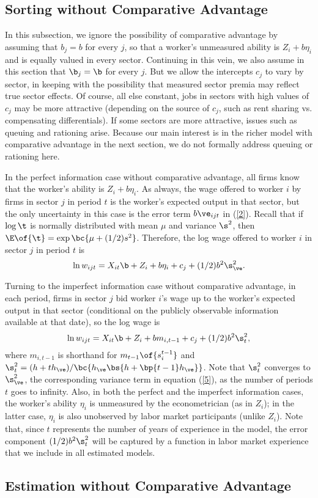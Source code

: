 \documentclass[12pt]{article}
\newcommand{\CiteReference}{../reference.bib}
\theoremstyle{definition}
\begin{document}
\subsection{Sorting without Comparative Advantage}

In this subsection, we ignore the possibility of comparative advantage by assuming that $b_j = b$ for every $j$, so that a worker's unmeasured ability is $Z_i + b \eta_i$ and is equally valued in every sector. Continuing in this vein, we also assume in this section that $\b_j = \b$ for every $j$. But we allow the intercepts $c_j$ to vary by sector, in keeping with the possibility that measured sector premia may reflect true sector effects. Of course, all else constant, jobs in sectors with high values of $c_j$ may be more attractive (depending on the source of $c_j$, such as rent sharing vs. compensating differentials). If some sectors are more attractive, issues such as queuing and rationing arise. Because our main interest is in the richer model with comparative advantage in the next section, we do not formally address queuing or rationing here. 

In the perfect information case without comparative advantage, all firms know that the worker's ability is $Z_i + b \eta_i$. As always, the wage offered to worker $i$ by firms in sector $j$ in period $t$ is the worker's expected output in that sector, but the only uncertainty in this case is the error term $b \ve_{ijt}$ in (\ref{2}). Recall that if $\log \t$ is normally distributed with mean $\mu$ and variance $\s^2$, then $\E\of{\t} = \exp\bc{\mu + (1/2)s^2}$. Therefore, the log wage offered to worker $i$ in sector $j$ in period $t$ is 
\begin{equation}
    \label{3}
    \ln w_{ijt} = X_{it} \b + Z_i + b \eta_i + c_j + (1/2) b^2 \s_\ve^2.
\end{equation}

Turning to the imperfect information case without comparative advantage, in each period, firms in sector $j$ bid worker $i$'s wage up to the worker's expected output in that sector (conditional on the publicly observable information available at that date), so the log wage is 
\begin{equation}
    \label{6}
    \ln w_{ijt} = X_{it} \b + Z_i + b m_{i, t-1} + c_j + (1/2) b^2 \s_t^2 ,
\end{equation}
where $m_{i, t-1}$ is shorthand for $m_{t-1}\of{s_i^{t-1}}$ and $\s_t^2 = (h + t h_\ve)/\bc{h_\ve\bs{h + \bp{t-1}h_\ve}}$. Note that $\s_t^2$ converges to $\s_\ve^2$, the corresponding variance term in equation (\ref{5}), as the number of periods $t$ goes to infinity. Also, in both the perfect and the imperfect information cases, the worker's ability $\eta_i$ is unmeasured by the econometrician (as in $Z_i$); in the latter case, $\eta_i$ is also unobserved by labor market participants (unlike $Z_i$). Note that, since $t$ represents the number of years of experience in the model, the error component $(1/2) b^2 \s_t^2$ will be captured by a function in labor market experience that we include in all estimated models. 

\subsection{Estimation without Comparative Advantage}










\end{document}
